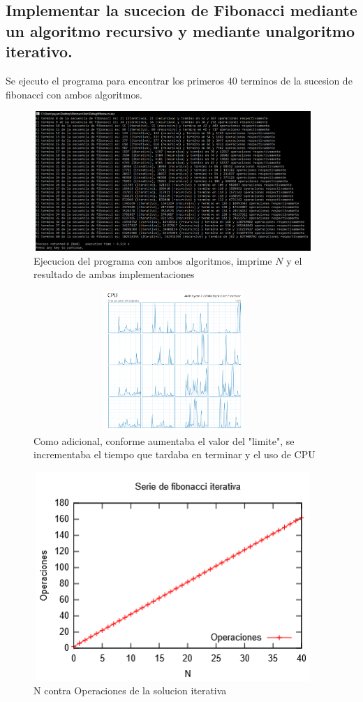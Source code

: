 \documentclass[spanish]{article}
\begin{document}
	\subsection{Implementar la sucecion de Fibonacci mediante un algoritmo recursivo y mediante unalgoritmo iterativo.}
	Se ejecuto el programa para encontrar los primeros 40 terminos de la sucesion de fibonacci con ambos algoritmos.			
	\begin{figure}[h!]
		\centering
		\includegraphics[width=400px,height=200px]{ejecucionPrimeraParte}
		\caption{Ejecucion del programa con ambos algoritmos, imprime $N$ y el resultado de ambas implementaciones}
	\end{figure}
	\begin{figure}[H]
		\centering
		\includegraphics[width=400px,height=200px]{cpu}
		\caption{Como adicional, conforme aumentaba el valor del "limite", se incrementaba el tiempo que tardaba en terminar y el uso de CPU}
	\end{figure}
	\begin{figure}[H]
		\centering
		\includegraphics[width=400px,height=300px]{grafica1}
		\caption{N contra Operaciones de la solucion iterativa}
	\end{figure}
\end{document}
